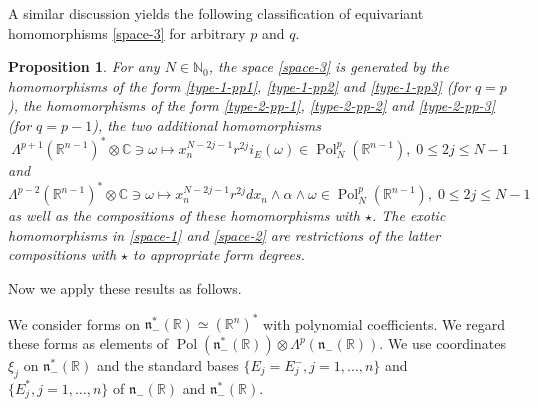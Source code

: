 \documentclass[a4paper,12pt,reqno]{amsart}
\newtheorem{prop}[theorem]{Proposition}
\numberwithin{theorem}{subsection}
\numberwithin{equation}{section}
\begin{document}
A similar discussion yields the following classification of equivariant
homomorphisms \eqref{space-3} for arbitrary $p$ and $q$.

\begin{prop}\label{hom-structure} For any $N \in {\mathbb{N}}_0$, the space \eqref{space-3}
is generated by the homomorphisms of the form \eqref{type-1-pp1},
\eqref{type-1-pp2} and \eqref{type-1-pp3} (for $q=p$), the homomorphisms of the
form \eqref{type-2-pp-1}, \eqref{type-2-pp-2} and \eqref{type-2-pp-3} (for
$q=p-1$), the two additional homomorphisms
\begin{equation}\label{add-homo-1}
   \Lambda^{p+1}({\mathbb{R}}^{n-1})^* \otimes {\mathbb{C}} \ni \omega \mapsto x_n^{N-2j-1} r^{2j}
   i_E(\omega) \in {\operatorname{Pol}}^p_N({\mathbb{R}}^{n-1}), \; 0 \le 2j \le N\!-\!1
\end{equation}
and
\begin{equation}\label{add-homo-2}
    \Lambda^{p-2}({\mathbb{R}}^{n-1})^* \otimes {\mathbb{C}} \ni \omega \mapsto x_n^{N-2j-1} r^{2j}
    dx_n \wedge \alpha \wedge \omega \in {\operatorname{Pol}}^p_N({\mathbb{R}}^{n-1}), \; 0 \le 2j \le
    N\!-\!1
\end{equation}
as well as the compositions of these homomorphisms with $\star$. The exotic
homomorphisms in \eqref{space-1} and \eqref{space-2} are restrictions of the
latter compositions with $\star$ to appropriate form degrees.
\end{prop}

Now we apply these results as follows.

We consider forms on ${{\mathfrak n}}_-^*({\mathbb{R}}) \simeq ({\mathbb{R}}^n)^*$ with polynomial
coefficients. We regard these forms as elements of ${\operatorname{Pol}}({{\mathfrak n}}_-^*({\mathbb{R}})) \otimes
\Lambda^p({{\mathfrak n}}_-({\mathbb{R}}))$. We use coordinates $\xi_j$ on ${{\mathfrak n}}_-^*({\mathbb{R}})$ and the
standard bases $\{E_j = E_j^-, j=1,\dots,n\}$ and $\{E_j^*, j=1,\dots,n\}$ of
${{\mathfrak n}}_-({\mathbb{R}})$ and ${{\mathfrak n}}^*_-({\mathbb{R}})$.
\end{document}
